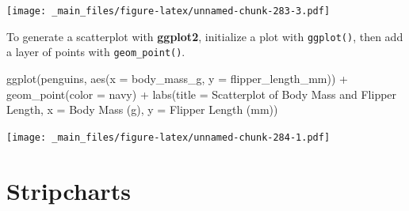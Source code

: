 \documentclass[
]{book}
\newenvironment{Shaded}{\begin{snugshade}}{\end{snugshade}}
\newcommand{\AttributeTok}[1]{\textcolor[rgb]{0.77,0.63,0.00}{#1}}
\newcommand{\DecValTok}[1]{\textcolor[rgb]{0.00,0.00,0.81}{#1}}
\newcommand{\FunctionTok}[1]{\textcolor[rgb]{0.00,0.00,0.00}{#1}}
\newcommand{\NormalTok}[1]{#1}
\newcommand{\SpecialCharTok}[1]{\textcolor[rgb]{0.00,0.00,0.00}{#1}}
\newcommand{\StringTok}[1]{\textcolor[rgb]{0.31,0.60,0.02}{#1}}
\begin{document}
\begin{Shaded}
\end{Shaded}

\texttt{[image: \_main\_files/figure-latex/unnamed-chunk-283-3.pdf]}

To generate a scatterplot with \textbf{ggplot2}, initialize a plot with \texttt{ggplot()}, then add a layer of points with \texttt{geom\_point()}.

\begin{Shaded}
\begin{Highlighting}[]
\FunctionTok{ggplot}\NormalTok{(penguins, }\FunctionTok{aes}\NormalTok{(}\AttributeTok{x =}\NormalTok{ body\_mass\_g, }\AttributeTok{y =}\NormalTok{ flipper\_length\_mm)) }\SpecialCharTok{+}
  \FunctionTok{geom\_point}\NormalTok{(}\AttributeTok{color =} \StringTok{\textquotesingle{}navy\textquotesingle{}}\NormalTok{) }\SpecialCharTok{+}
  \FunctionTok{labs}\NormalTok{(}\AttributeTok{title =} \StringTok{\textquotesingle{}Scatterplot of Body Mass and Flipper Length\textquotesingle{}}\NormalTok{, }
       \AttributeTok{x =} \StringTok{\textquotesingle{}Body Mass (g)\textquotesingle{}}\NormalTok{, }\AttributeTok{y =} \StringTok{\textquotesingle{}Flipper Length (mm)\textquotesingle{}}\NormalTok{)}
\end{Highlighting}
\end{Shaded}

\texttt{[image: \_main\_files/figure-latex/unnamed-chunk-284-1.pdf]}

\hypertarget{stripcharts}{%
\section{Stripcharts}\label{stripcharts}}
\end{document}
